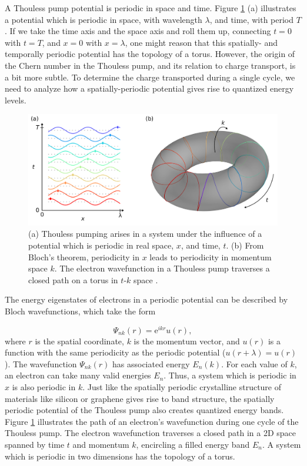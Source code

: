 \documentclass[double,12pt,1in,seploa]{beavtex}
\begin{document}
A Thouless pump potential is periodic in space and time. Figure \ref{thouless pump torus} (a) illustrates a potential which is periodic in space, with wavelength $\lambda$, and time, with period $T$. If we take the time axis and the space axis and roll them up, connecting $t = 0$ with $t = T$, and $x = 0$ with $x = \lambda$, one might reason that this spatially- and temporally periodic potential has the topology of a torus. However, the origin of the Chern number in the Thouless pump, and its relation to charge transport, is a bit more subtle. To determine the charge transported during a single cycle, we need to analyze how a spatially-periodic potential gives rise to quantized energy levels.

\begin{figure}
    \includegraphics{Thouless pump fig.png}
    \caption{(a) Thouless pumping arises in a system under the influence of a potential which is periodic in real space, $x$, and time, $t$. (b) From Bloch's theorem, periodicity in $x$ leads to periodicity in momentum space $k$. The electron wavefunction in a Thouless pump traverses a closed path on a torus in $t\textrm{-}k$ space \cite{thouless_quantization_1983}.}
    \label{thouless pump torus}
\end{figure}

The energy eigenstates of electrons in a periodic potential can be described by Bloch wavefunctions, which take the form

\begin{equation}
    \Psi_{nk}(r) = \mathrm{e}^{ikr}u(r), \label{Bloch's theorem}
\end{equation}
where $r$ is the spatial coordinate, $k$ is the momentum vector, and $u(r)$ is a function with the same periodicity as the periodic potential ($u(r+ \lambda) = u(r)$). The wavefunction $\Psi_{nk}(r)$ has associated energy $E_n(k)$. For each value of $k$, an electron can take many valid energies $E_n$. Thus, a system which is periodic in $x$ is also periodic in $k$. Just like the spatially periodic crystalline structure of materials like silicon or graphene gives rise to band structure, the spatially periodic potential of the Thouless pump also creates quantized energy bands. Figure \ref{thouless pump torus} illustrates the path of an electron's wavefunction during one cycle of the Thouless pump. The electron wavefunction traverses a closed path in a 2D space spanned by time $t$ and momentum $k$, encircling a filled energy band $E_n$. A system which is periodic in two dimensions has the topology of a torus.
\end{document}
